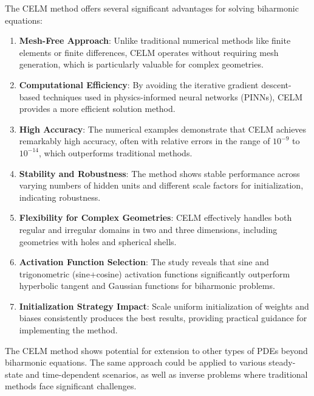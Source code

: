 \documentclass[11pt]{article}
\begin{document}
The CELM method offers several significant advantages for solving biharmonic equations:

\begin{enumerate}
    \item \textbf{Mesh-Free Approach}: Unlike traditional numerical methods like finite elements or finite differences, CELM operates without requiring mesh generation, which is particularly valuable for complex geometries.
    
    \item \textbf{Computational Efficiency}: By avoiding the iterative gradient descent-based techniques used in physics-informed neural networks (PINNs), CELM provides a more efficient solution method.
    
    \item \textbf{High Accuracy}: The numerical examples demonstrate that CELM achieves remarkably high accuracy, often with relative errors in the range of $10^{-9}$ to $10^{-14}$, which outperforms traditional methods.
    
    \item \textbf{Stability and Robustness}: The method shows stable performance across varying numbers of hidden units and different scale factors for initialization, indicating robustness.
    
    \item \textbf{Flexibility for Complex Geometries}: CELM effectively handles both regular and irregular domains in two and three dimensions, including geometries with holes and spherical shells.
    
    \item \textbf{Activation Function Selection}: The study reveals that sine and trigonometric (sine+cosine) activation functions significantly outperform hyperbolic tangent and Gaussian functions for biharmonic problems.
    
    \item \textbf{Initialization Strategy Impact}: Scale uniform initialization of weights and biases consistently produces the best results, providing practical guidance for implementing the method.
\end{enumerate}

The CELM method shows potential for extension to other types of PDEs beyond biharmonic equations. The same approach could be applied to various steady-state and time-dependent scenarios, as well as inverse problems where traditional methods face significant challenges.
\end{document}
